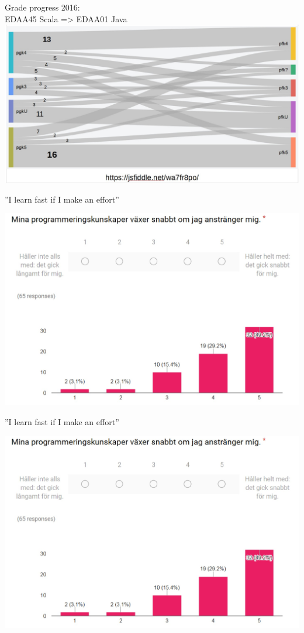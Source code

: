 \documentclass{lecturenotes}
\begin{document}
\begin{Slide}{Grade progress 2016:\\EDAA45 Scala => EDAA01 Java}
\includegraphics[width=1.05\textwidth]{img/2016}
\end{Slide}



\begin{Slide}{''I learn fast if I make an effort''}
\begin{center}
\includegraphics[width=\textwidth]{img/Q-learn-quick}
\end{center}
\end{Slide}


\begin{Slide}{''I learn fast if I make an effort''}
\begin{center}
\includegraphics[width=\textwidth]{img/Q-learn-quick}
\end{center}
\end{Slide}
\end{document}
